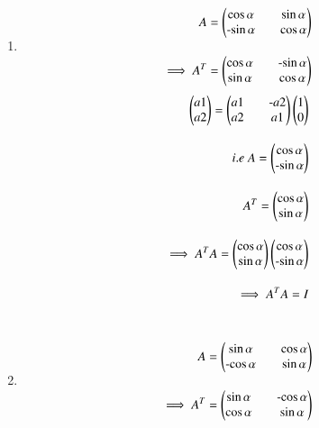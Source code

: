 \begin{enumerate}
\item 
\begin{align}
A = \myvec{\cos{\alpha} && \sin{\alpha} \\ $-$\sin{\alpha} && \cos{\alpha}} \\[1em]
\implies A^T = \myvec{\cos{\alpha} && $-$\sin{\alpha} \\ \sin{\alpha} && \cos{\alpha}}    
\end{align}
\begin{align}
\myvec{a1 \\ a2} = \myvec{a1 && $-$a2 \\ a2 && a1}\myvec{1 \\ 0}\\[1em]
i.e \ A = \myvec{\cos{\alpha} \\ $-$\sin{\alpha}}\\[1em]
A^T = \myvec{\cos{\alpha} \\ \sin{\alpha}} \\[1em]
\implies A^TA = \myvec{\cos{\alpha} \\ \sin{\alpha}}\myvec{\cos{\alpha} \\ $-$\sin{\alpha}}\\[1em]
\implies A^TA = I
\end{align}\\
\item 
\begin{align}
A = \myvec{\sin{\alpha} && \cos{\alpha} \\ $-$\cos{\alpha} && \sin{\alpha}} \\[1em]
\implies A^T = \myvec{\sin{\alpha} && $-$\cos{\alpha} \\ \cos{\alpha} && \sin{\alpha}}    
\end{align}\\

\end{enumerate}
